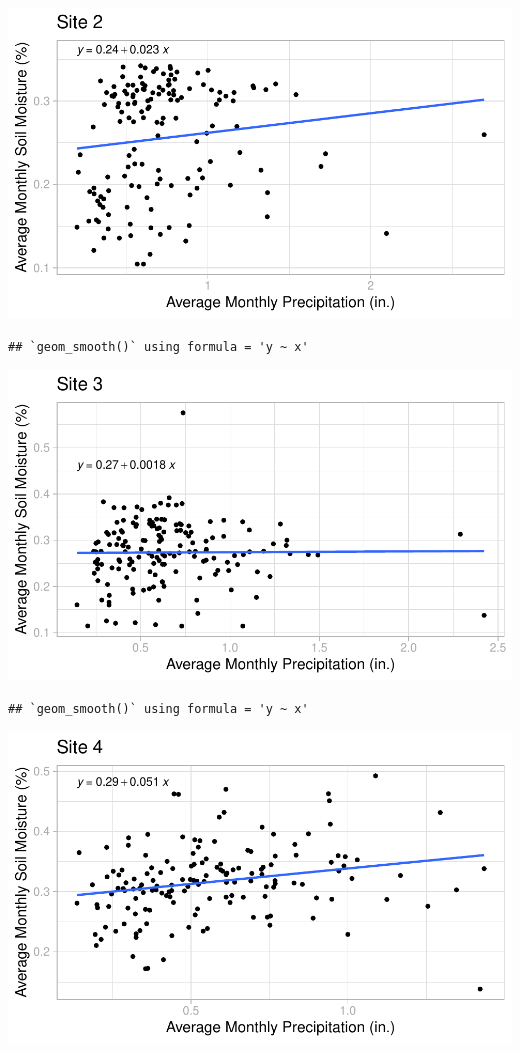 \documentclass[
  12pt,
]{article}
\begin{document}
\includegraphics{Project_Template_files/figure-latex/Average Monthly Soil Moisture and Precipitation Plots-2.pdf}

\begin{verbatim}
## `geom_smooth()` using formula = 'y ~ x'
\end{verbatim}

\includegraphics{Project_Template_files/figure-latex/Average Monthly Soil Moisture and Precipitation Plots-3.pdf}

\begin{verbatim}
## `geom_smooth()` using formula = 'y ~ x'
\end{verbatim}

\includegraphics{Project_Template_files/figure-latex/Average Monthly Soil Moisture and Precipitation Plots-4.pdf}
\end{document}
